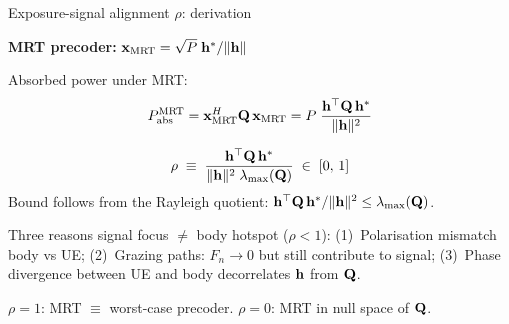 \begin{frame}[label=app-p3-rho]{Exposure-signal alignment $\rho$: derivation}

  \textbf{MRT precoder:} $\mathbf{x}_{\mathrm{MRT}} = \sqrt{P}\;\mathbf{h}^*/\|\mathbf{h}\|$

  \vspace{4pt}
  Absorbed power under MRT:
  \[
    P_{\mathrm{abs}}^{\mathrm{MRT}}
    = \mathbf{x}_{\mathrm{MRT}}^H \mathbf{Q}\,\mathbf{x}_{\mathrm{MRT}}
    = P\;\frac{\mathbf{h}^\top \mathbf{Q}\,\mathbf{h}^*}{\|\mathbf{h}\|^2}
  \]

  \begin{resultbox}
    \vspace{-4pt}
    \[
      \rho \;\equiv\; \frac{\mathbf{h}^\top \mathbf{Q}\,\mathbf{h}^*}{\|\mathbf{h}\|^2\;\lambda_{\max}(\mathbf{Q})}
      \;\in\; [0,\,1]
    \]
    \vspace{-4pt}
    {\small Bound follows from the Rayleigh quotient: $\mathbf{h}^\top\mathbf{Q}\,\mathbf{h}^*/\|\mathbf{h}\|^2 \le \lambda_{\max}(\mathbf{Q})$.}
  \end{resultbox}

  \vspace{2pt}
  {\small
  Three reasons signal focus $\neq$ body hotspot ($\rho < 1$):
  (1)~Polarisation mismatch body vs UE;
  (2)~Grazing paths: $F_n \to 0$ but still contribute to signal;
  (3)~Phase divergence between UE and body decorrelates $\mathbf{h}$ from $\mathbf{Q}$.
  }

  \vspace{0pt}
  {\footnotesize $\rho = 1$: MRT $\equiv$ worst-case precoder. \quad $\rho = 0$: MRT in null space of $\mathbf{Q}$.}
  \vspace{-4pt}
\end{frame}

